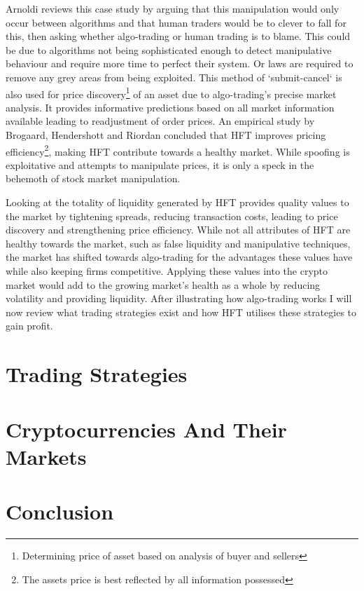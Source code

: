 Arnoldi reviews this case study by arguing that this manipulation would only occur between algorithms and that human traders would be to clever to fall for this, then asking whether algo-trading or human trading is to blame. This could be due to algorithms not being sophisticated enough to detect manipulative behaviour and require more time to perfect their system. Or laws are required to remove any grey areas from being exploited. This method of `submit-cancel` is also used for price discovery\footnote{Determining price of asset based on analysis of buyer and sellers} of an asset due to algo-trading's precise market analysis. It provides informative predictions based on all market information available leading to readjustment of order prices. An empirical study by Brogaard, Hendershott and Riordan \cite{UNPUB:Brogaard:2017} concluded that HFT improves pricing efficiency\footnote{The assets price is best reflected by all information possessed}, making HFT contribute towards a healthy market. While spoofing is exploitative and attempts to manipulate prices, it is only a speck in the behemoth of stock market manipulation. 

Looking at the totality of liquidity generated by HFT provides quality values to the market by tightening spreads, reducing transaction costs, leading to price discovery and strengthening price efficiency. While not all attributes of HFT are healthy towards the market, such as false liquidity and manipulative techniques, the market has shifted towards algo-trading for the advantages these values have while also keeping firms competitive. Applying these values into the crypto market would add to the growing market's health as a whole by reducing volatility and providing liquidity. After illustrating how algo-trading works I will now review what trading strategies exist and how HFT utilises these strategies to gain profit.




\section{Trading Strategies}
\label{sec:related:tradingStrategies}


\section{Cryptocurrencies And Their Markets}
\label{sec:related:cryptoAndTheirMarkets}


\section{Conclusion}
\label{sec:related:conclusion}

